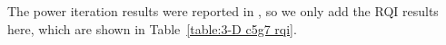 \documentclass[preprint,12pt]{elsarticle}
\begin{document}
The power iteration results were reported in \cite{Slaybaugh2013}, so we only add the RQI results here, which are shown in Table~\ref{table:3-D c5g7 rqi}.
% 
\end{document}
